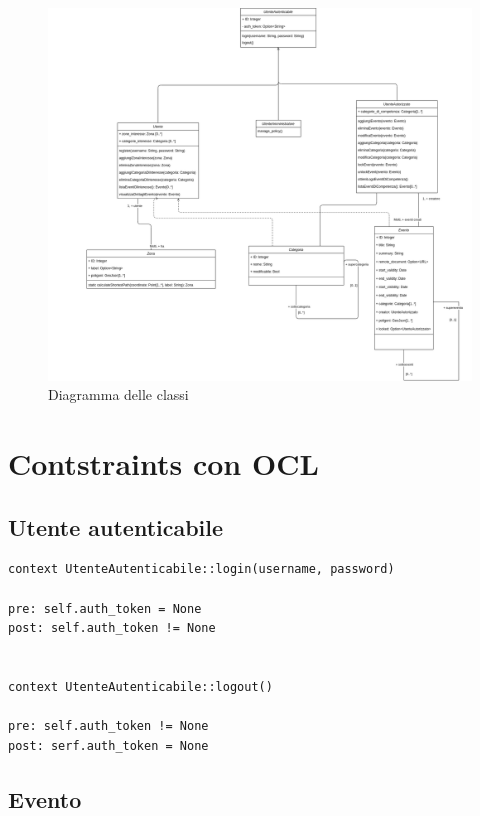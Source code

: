 \documentclass{article}
\begin{document}
\clearpage

\begin{figure}[htbp]
	\centering
	\includegraphics[width=1\textwidth]{Images/ClassDiagram.png}
	\caption{Diagramma delle classi}
	\label{fig:class-diagram}
\end{figure}


\section{Contstraints con OCL}



\subsection{Utente autenticabile}

\begin{verbatim}
context UtenteAutenticabile::login(username, password)

pre: self.auth_token = None
post: self.auth_token != None


context UtenteAutenticabile::logout()

pre: self.auth_token != None
post: serf.auth_token = None
\end{verbatim}

\subsection{Evento}
\end{document}
